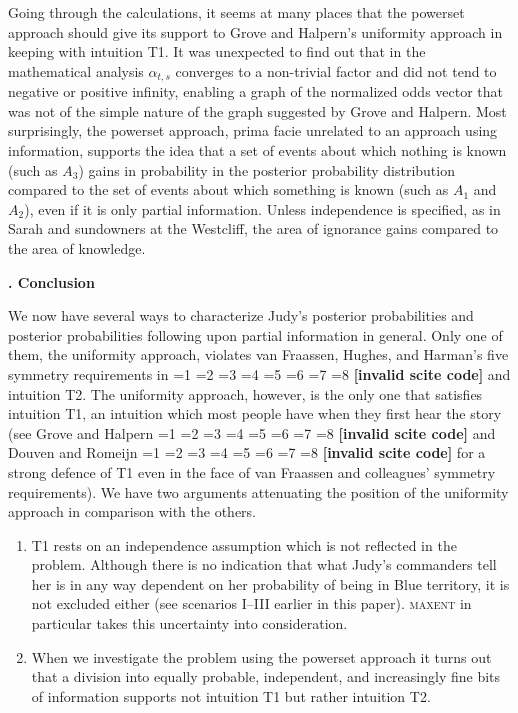 \documentclass[12pt]{article}
\newcommand{\kapt}[1]{\textbf{{\thechap}. #1}\addtocounter{chap}{1}}
\newcommand{\tbd}[1]{}
\newcommand{\qeins}[1]{``#1''}
\newif\ifNumericalOrYear
\newcommand{\PageP}{p.~}
\newcommand{\PageP}{}
\newcommand{\scite}[3]{\ifnum#1=1\ifNumericalOrYear\citep{#2}\else\citeyearpar{#2}\fi\else
\ifnum#1=2\ifNumericalOrYear\citep[#3]{#2}\else\citep[{\PageP}#3]{#2}\fi\else
\ifnum#1=3\ifNumericalOrYear(\citet[#3]{#2})\else\citep[{\PageP}#3]{#2}\fi\else
\ifnum#1=4\ifNumericalOrYear\citet{#2}\else\citet{#2}\fi\else
\ifnum#1=5\ifNumericalOrYear(\citet{#2})\else\citep{#2}\fi\else
\ifnum#1=6\ifNumericalOrYear(\citet[#3]{#2})\else\citep[{\PageP}#3]{#2}\fi\else
\ifnum#1=7\ifNumericalOrYear\citep{#2}\else\citealp{#2}\fi\else
\ifnum#1=8\ifNumericalOrYear\citep[#3]{#2}\else\citealp[{\PageP}#3]{#2}\fi\else
\textbf{[invalid scite code]}\fi\fi\fi\fi\fi\fi\fi\fi}
\begin{document}
Going through the calculations, it seems at many places that the
powerset approach should give its support to Grove and Halpern's
uniformity approach in keeping with intuition T1. It was unexpected to
find out that in the mathematical analysis $\alpha_{t,s}$ converges to
a non-trivial factor and did not tend to negative or positive
infinity, enabling a graph of the normalized odds vector that was not
of the simple nature of the graph suggested by Grove and Halpern. Most
surprisingly, the powerset approach, prima facie unrelated to an
approach using information, supports the idea that a set of events
about which nothing is known (such as $A_{3}$) gains in probability in
the posterior probability distribution compared to the set of events
about which something is known (such as $A_{1}$ and $A_{2}$), even if
it is only partial information. Unless independence is specified, as
in Sarah and sundowners at the Westcliff, the area of ignorance gains
compared to the area of knowledge.

\kapt{Conclusion}

\tbd{We suggest that Seidenfeld's objection that \textsc{maxent} is
\qeins{excessively aprioristic} is a simple instance of the
well-calibrated Bayesian's problem with coherence (see
\scite{7}{dawid82}{}) and pertains to Bayesian conditionalization
methods in general.}

We now have several ways to characterize Judy's posterior
probabilities and posterior probabilities following upon partial
information in general. Only one of them, the uniformity approach,
violates van Fraassen, Hughes, and Harman's five symmetry requirements
in \scite{1}{fraassenetal86}{} and intuition T2. The uniformity
approach, however, is the only one that satisfies intuition T1, an
intuition which most people have when they first hear the story (see
Grove and Halpern \scite{7}{grovehalpern97}{} and Douven and Romeijn
\scite{7}{douvenromeijn09}{} for a strong defence of T1 even in the
face of van Fraassen and colleagues' symmetry requirements). We have
two arguments attenuating the position of the uniformity approach in
comparison with the others.

\begin{enumerate}[(1)]
\item T1 rests on an independence assumption which is not reflected in
  the problem. Although there is no indication that what Judy's
  commanders tell her is in any way dependent on her probability of
  being in Blue territory, it is not excluded either (see scenarios
  I--III earlier in this paper). \textsc{maxent} in particular takes
  this uncertainty into consideration.
\item When we investigate the problem using the powerset approach it
  turns out that a division into equally probable, independent, and
  increasingly fine bits of information supports not intuition T1 but
  rather intuition T2.
\end{enumerate}
\end{document}

